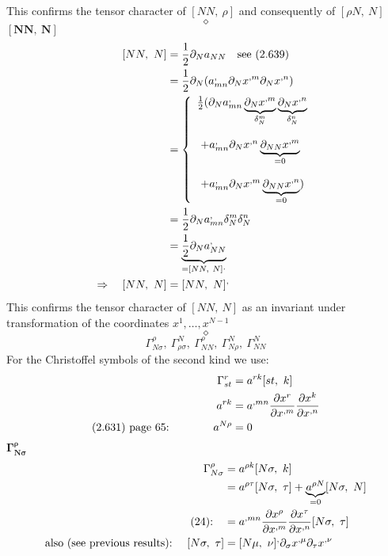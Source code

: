 This confirms the tensor character of $[ NN, \ \rho ] $ and consequently of $[\rho N, \ N ]$
$$\diamond$$
\newpage
$\boldsymbol{[NN, \ N ] }$\\
\begin{align}
\ [ NN, \ N ] &= \frac{1}{2} \partial_{N} a_{NN}\quad \text{see (2.639)}\\
\ &= \frac{1}{2} \partial_{N} (a^{,}_{mn}\partial_{N}x^{,m}\partial_{N}x^{,n})\\
\ & = \left\{ \begin{array}{l}
\frac{1}{2} (\partial_{N} a^{,}_{mn}\underbrace{\partial_{N}x^{,m}}_{\delta^m_N}\underbrace{\partial_{N}x^{,n}}_{\delta^n_N}\\\\
\ + a^{,}_{mn} \partial_{N}x^{,n} \underbrace{\partial_{N N}x^{,m}}_{=0}\\\\
\ + a^{,}_{mn} \partial_{N}x^{,m} \underbrace{\partial_{N N}x^{,n}}_{=0})
\end{array} \right.\\
\ &= \frac{1}{2} \partial_{N} a^{,}_{mn}\delta^m_N\delta^n_N\\
\ &=  \underbrace{\frac{1}{2} \partial_{N} a^{,}_{NN}}_{=[ NN, \ N ]^,} \\
\Rightarrow \quad [ NN, \ N ] &=  [ NN, \ N ]^,
\end{align}
This confirms the tensor character of $[ NN, \ N ] $ as an invariant under transformation of the coordinates $x^1, \dots , x^{N-1}$
$$\diamond$$
$$\Gamma^{\rho}_{N \sigma},\ \Gamma^{N}_{\rho \sigma},\ \Gamma^{\rho}_{N N}, \ \Gamma^{N}_{N \rho}, \ \Gamma^{N}_{N N}$$
For the Christoffel symbols of the second kind we use:
\begin{align}
\Gamma^r_{st} &= a^{rk}[st,\ k]\\
\ a^{rk} &= a^{,mn}\pdv{x^r}{x^{,m}}\pdv{x^k}{x^{,n}}\\
 \text{(2.631) page 65:}\quad\quad\quad\quad a^{N \rho} &= 0 
\end{align}
\newpage
$\boldsymbol{\Gamma^{\rho}_{N \sigma}}$\\
\begin{align}
\Gamma^{\rho}_{N \sigma} &= a^{\rho k}[N \sigma,\ k]\\
\ & = a^{\rho \tau}[N \sigma,\ \tau]+ \underbrace{a^{\rho N}}_{=0}[N \sigma,\ N]\\
\text{(24):}\quad &= a^{,mn}\pdv{x^{\rho}}{x^{,m}}\pdv{x^{\tau}}{x^{,n}}[N \sigma,\ \tau]\\
\text{also (see previous results):}\quad \ [N \sigma,\ \tau] &= [ N \mu, \ \nu]^{,}\partial_{\sigma}x^{,\mu}\partial_{\tau}x^{,\nu}
\end{align}
